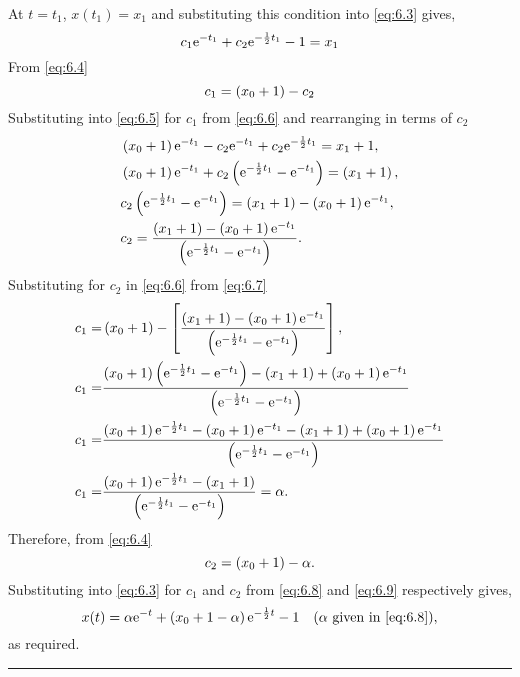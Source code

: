At $t=t_1$, $x(t_1) = x_1$ and substituting this condition into \eqref{eq:6.3} gives,
\begin{equation}
	\label{eq:6.5}
	c_1\mathrm{e}^{-t_1} + c_2\mathrm{e}^{-\frac{1}{2} t_1} - 1 = x_1
\end{equation}
From \eqref{eq:6.4}
\begin{equation}
	\label{eq:6.6}
	c_1 = \left(x_0 + 1\right) - c_2
\end{equation}
Substituting into \eqref{eq:6.5} for $c_1$ from \eqref{eq:6.6} and rearranging in terms of $c_2$
\begin{align}
	\label{eq:6.7}
	{}&\left(x_0 + 1\right)\mathrm{e}^{-t_1} -c_2\mathrm{e}^{-t_1} + c_2\mathrm{e}^{-\frac{1}{2} t_1} = x_1 + 1,\nonumber\\
	{}&\left(x_0 + 1\right)\mathrm{e}^{-t_1} + c_2\left(\mathrm{e}^{-\frac{1}{2} t_1} - \mathrm{e}^{-t_1}\right) = \left(x_1 + 1\right),\nonumber\\
	{}&c_2\left(\mathrm{e}^{-\frac{1}{2} t_1} - \mathrm{e}^{-t_1}\right) = \left(x_1 + 1\right) - \left(x_0 + 1\right)\mathrm{e}^{-t_1},\nonumber\\
	{}&c_2 = \frac{\left(x_1 + 1\right) - \left(x_0 + 1\right)\mathrm{e}^{-t_1}}{\left(\mathrm{e}^{-\frac{1}{2} t_1} - \mathrm{e}^{-t_1}\right)}.
\end{align}
Substituting for $c_2$ in \eqref{eq:6.6} from \eqref{eq:6.7}
\begin{align}
		\label{eq:6.8}
		c_1 =& \left(x_0 + 1\right) - \left[\frac{\left(x_1 + 1\right) - \left(x_0 + 1\right)\mathrm{e}^{-t_1}}{\left(\mathrm{e}^{-\frac{1}{2} t_1} - \mathrm{e}^{-t_1}\right)}\right],\nonumber\\
		c_1 =& \frac{\left(x_0 + 1\right)\left(\mathrm{e}^{-\frac{1}{2} t_1} - \mathrm{e}^{-t_1}\right) - \left(x_1 + 1\right) + \left(x_0 + 1\right)\mathrm{e}^{-t_1}}{\left(\mathrm{e}^{-\frac{1}{2} t_1} - \mathrm{e}^{-t_1}\right)}\nonumber\\
		c_1 =& \frac{\left(x_0 + 1\right)\mathrm{e}^{-\frac{1}{2} t_1} - \left(x_0 + 1\right)\mathrm{e}^{-t_1} - \left(x_1 + 1\right) + \left(x_0 + 1\right)\mathrm{e}^{-t_1}}{\left(\mathrm{e}^{-\frac{1}{2} t_1} - \mathrm{e}^{-t_1}\right)}\nonumber\\
		c_1 =& \frac{\left(x_0 + 1\right)\mathrm{e}^{-\frac{1}{2} t_1} - \left(x_1 + 1\right)}{\left(\mathrm{e}^{-\frac{1}{2} t_1} - \mathrm{e}^{-t_1}\right)} = \alpha.
\end{align}
Therefore, from \eqref{eq:6.4} 
\begin{equation}
	\label{eq:6.9}
	c_2 = \left(x_0 + 1\right) - \alpha.
\end{equation}
Substituting into \eqref{eq:6.3} for $c_1$ and $c_2$ from \eqref{eq:6.8} and \eqref{eq:6.9} respectively gives,
\begin{equation*}
	x(t) = \alpha\mathrm{e}^{-t} + \left(x_0 + 1 - \alpha\right)\mathrm{e}^{-\frac{1}{2} t} - 1 \quad (\alpha \textrm{ given in \eqref{eq:6.8}}),
\end{equation*}
as required.

\rule{\textwidth}{2pt}